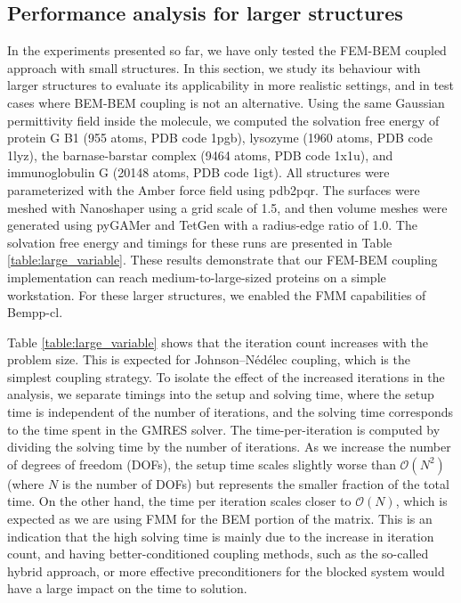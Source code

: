 \subsection*{\sffamily \large Performance analysis for larger structures}

In the experiments presented so far, we have only tested the FEM-BEM coupled approach with small structures. In this section, we study its behaviour with larger structures to evaluate its applicability in more realistic settings, and in test cases where BEM-BEM coupling is not an alternative. Using the same Gaussian permittivity field inside the molecule, we computed the solvation free energy of protein G B1 (955 atoms, PDB code 1pgb), lysozyme (1960 atoms, PDB code 1lyz), the barnase-barstar complex (9464 atoms, PDB code 1x1u), and immunoglobulin G (20148 atoms, PDB code 1igt). All structures were parameterized with the Amber\cite{Swanson05} force field using pdb2pqr.\cite{Dolinsky04} The surfaces were meshed with Nanoshaper\cite{decherchi2013general} using a grid scale of 1.5, and then volume meshes were generated using pyGAMer\cite{lee2020open} and TetGen\cite{hang2015tetgen} with a radius-edge ratio of 1.0. The solvation free energy and timings for these runs are presented in Table \ref{table:large_variable}. These results demonstrate that our FEM-BEM coupling implementation can reach medium-to-large-sized proteins on a simple workstation. For these larger structures, we enabled the FMM capabilities of Bempp-cl.

Table \ref{table:large_variable} shows that the iteration count increases with the problem size. This is expected for Johnson--N\'ed\'elec coupling, which is the simplest coupling strategy. To isolate the effect of the increased iterations in the analysis, we separate timings into the setup and solving time, where the setup time is independent of the number of iterations, and the solving time corresponds to the time spent in the GMRES solver. The time-per-iteration is computed by dividing the solving time by the number of iterations.
As we increase the number of degrees of freedom (DOFs), the setup time scales slightly worse than $\mathcal{O}(N^2)$ (where $N$ is the number of DOFs) but represents the smaller fraction of the total time.
On the other hand, the time per iteration scales closer to $\mathcal{O}(N)$, which is expected as we are using FMM for the BEM portion of the matrix.
This is an indication that the high solving time is mainly due to the increase in iteration count, and having better-conditioned coupling methods, such as the so-called hybrid approach\cite{betcke2022hybrid}, or more effective preconditioners for the blocked system would have a large impact on the time to solution.

